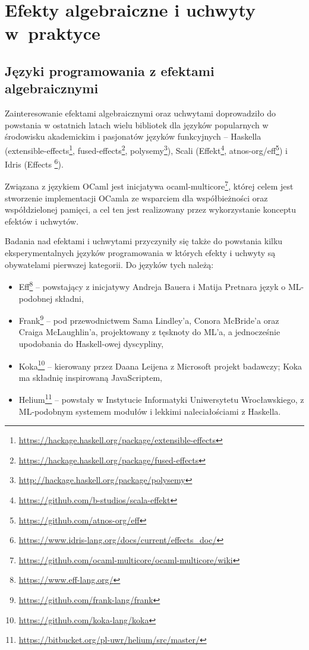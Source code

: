 
\newcommand{\inl}[1]{\lstinline[style=Haleff-inl]{#1}}

\chapter{Efekty algebraiczne i uchwyty w~praktyce}

\section{Języki programowania z efektami algebraicznymi}

Zainteresowanie efektami algebraicznymi oraz uchwytami doprowadziło do powstania w ostatnich latach wielu bibliotek dla języków popularnych w środowisku akademickim i pasjonatów języków funkcyjnych -- Haskella (extensible-effects\footnote{\url{https://hackage.haskell.org/package/extensible-effects}},
fused-effects\footnote{\url{https://hackage.haskell.org/package/fused-effects}},
polysemy\footnote{\url{http://hackage.haskell.org/package/polysemy}}), Scali
(Effekt\footnote{\url{https://github.com/b-studios/scala-effekt}},
atnos-org/eff\footnote{\url{https://github.com/atnos-org/eff}})
i Idris (Effects \footnote{\url{https://www.idris-lang.org/docs/current/effects_doc/}}).

Związana z językiem OCaml jest inicjatywa ocaml-multicore\footnote{\url{https://github.com/ocaml-multicore/ocaml-multicore/wiki}}, której celem jest stworzenie implementacji OCamla ze wsparciem dla współbieżności oraz współdzielonej pamięci, a cel ten jest realizowany przez wykorzystanie konceptu efektów i uchwytów.

Badania nad efektami i uchwytami przyczyniły się także do powstania kilku eksperymentalnych języków programowania w których efekty i uchwyty są obywatelami pierwszej kategorii. Do języków tych należą:
\begin{itemize}
\item Eff\footnote{\url{https://www.eff-lang.org/}} -- powstający z inicjatywy Andreja Bauera i Matija Pretnara język o ML-podobnej składni,
\item Frank\footnote{\url{https://github.com/frank-lang/frank}} \cite{DBLP:journals/corr/LindleyMM16} -- pod przewodnictwem Sama Lindley'a, Conora McBride'a oraz Craiga McLaughlin'a, projektowany z tęsknoty do ML'a, a jednocześnie upodobania do Haskell-owej dyscypliny,
\item Koka\footnote{\url{https://github.com/koka-lang/koka}} -- kierowany przez Daana Leijena z Microsoft projekt badawczy; Koka ma składnię inspirowaną JavaScriptem,
\item Helium\footnote{\url{https://bitbucket.org/pl-uwr/helium/src/master/}} \cite{biernacki2019abstracting} -- powstały w Instytucie Informatyki Uniwersytetu Wrocławskiego, z ML-podobnym systemem modułów i lekkimi naleciałościami z Haskella.
\end{itemize}

